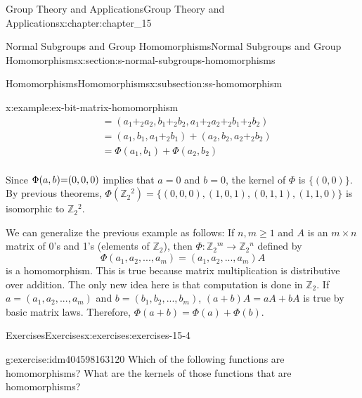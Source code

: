 \documentclass[twoside,10pt,]{book}
\numberwithin{equation}{section}
\begin{document}
\begin{chapterptx}{Group Theory and Applications}{}{Group Theory and Applications}{}{}{x:chapter:chapter_15}
\begin{sectionptx}{Normal Subgroups and Group Homomorphisms}{}{Normal Subgroups and Group Homomorphisms}{}{}{x:section:s-normal-subgroups-homomorphisms}
\begin{subsectionptx}{Homomorphisms}{}{Homomorphisms}{}{}{x:subsection:ss-homomorphism}
\begin{example}{}{x:example:ex-bit-matrix-homomorphism}
\begin{equation*}
\begin{split}
& = \left(a_1+_2a_2,b_1 +_2 b_2 ,a_1+_2a_2+_2b_1 +_2 b_2\right)\\
& = \left(a_1,b_1 , a_1+_2b_1\right)+\left(a_2,b_2 , a_2+_2b_2\right)\\
& =\Phi \left(a_1,b_1\right)+\Phi \left(a _2 , b_2 \right)\\
\end{split}
\end{equation*}
%
\par
Since \(\Phi (a, b)\text = (0, 0, 0)\) implies that \(a = 0\) and \(b = 0\), the kernel of \(\Phi\) is \(\{(0, 0)\}\). By previous theorems, \(\Phi
\left(\mathbb{Z}_2{}^2\right)= \{(0, 0, 0), (1, 0, 1), (0, 1, 1), (1, 1, 0)\}\) is isomorphic to \(\mathbb{Z}_2{}^2\).%
\end{example}
We can generalize the previous example as follows: If \(n, m \geq  1\) and \(A\) is an \(m\times  n\) matrix of 0's and 1's (elements of \(\mathbb{Z}_2\)), then \(\Phi :\mathbb{Z}_2{}^m\to \mathbb{Z}_2{}^n\) defined by%
\begin{equation*}
\Phi \left(a_1, a_2 , . . . , a _m \right) = \left(a_1, a_2 , . . . , a _m\right)A
\end{equation*}
is a homomorphism. This is true because matrix multiplication is distributive over addition. The only new idea here is that computation is done in \(\mathbb{Z}_2\).  If \(a=\left(a_1, a_2 , . . . , a _m\right)\) and \(b=\left(b_1, b_2 , . . . , b _m\right)\), \((a + b)A = a A + b A\) is true by basic matrix laws.  Therefore, \(\Phi (a + b) = \Phi (a) + \Phi (b)\).%
\end{subsectionptx}
%
%
\typeout{************************************************}
\typeout{************************************************}
%
\begin{exercises-subsection}{Exercises}{}{Exercises}{}{}{x:exercises:exercises-15-4}
\begin{divisionexercise}{1}{}{}{g:exercise:idm404598163120}%
Which of the following functions are homomorphisms? What are the kernels of those functions that are homomorphisms?%
\end{divisionexercise}
\end{exercises-subsection}
\end{sectionptx}
\end{chapterptx}
\end{document}
